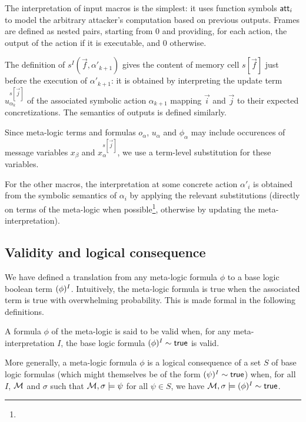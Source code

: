 The interpretation of input macros is the simplest:
it uses function symbols $\mathsf{att}_i$ to model the arbitrary attacker's
computation based on previous outputs.
Frames are defined as nested pairs, starting from $0$ and
providing, for each action, the output of the action if it is executable,
and $0$ otherwise.

The definition of $s^I(\vec{f},\alpha'_{k+1})$ gives the content of memory
cell $s[\vec{f}]$ just before the execution of $\alpha'_{k+1}$:
it is obtained by interpreting the update term $u_{\alpha_k}^{s[\vec{j}]}$
of the associated symbolic action $\alpha_{k+1}$ mapping $\vec{i}$
and $\vec{j}$ to their expected concretizations.
The semantics of outputs is defined similarly.

Since meta-logic terms and formulas $o_{\alpha}$, $u_{\alpha}$ and
$\phi_{\alpha}$ may include occurences of message variables
$x_\beta$ and $x_{\alpha}^{s[\vec{j}]}$,
we use a term-level substitution for these variables.



    For the other macros, the interpretation at some concrete
    action $\alpha'_i$ is obtained from the symbolic semantics of
    $\alpha_i$ by applying the relevant substitutions (directly
    on terms of the meta-logic when possible\footnote{
    }, otherwise by updating the meta-interpretation).


\subsection{Validity and logical consequence}

We have defined a translation from any meta-logic formula $\phi$
to a base logic boolean term $(\phi)^I$. Intuitively, the
meta-logic formula is true when the associated term is true with
overwhelming probability. This is made formal in the following
definitions.

\begin{definition}
  A formula $\phi$ of the meta-logic is said to be valid when,
  for any meta-interpretation $I$, the base logic formula
  $(\phi)^{I} \sim \textsf{true}$ is valid.

  More generally, a meta-logic formula $\phi$ is a
  logical consequence of a set $S$ of base logic formulas
  (which might themselves be of the form $(\psi)^I \sim \textsf{true}$)
  when, for all $I$, $\mathcal{M}$ and $\sigma$ such that
  $\mathcal{M},\sigma \models \psi$ for all $\psi\in S$,
  we have
  $\mathcal{M},\sigma \models(\phi)^{I}\sim\mathsf{true}$.
\end{definition}

